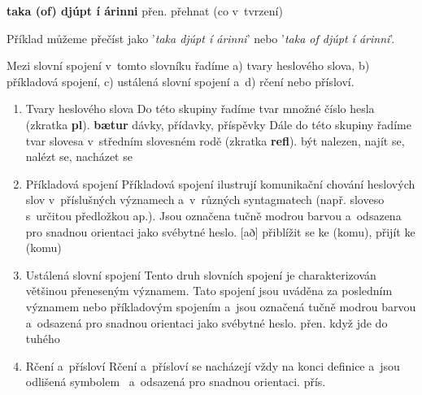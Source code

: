 \blspace
  \dicEntry {}   \textbf{taka (of) djúpt í árinni} {\footnotesize{přen.}} {přehnat (co v~tvrzení)}
\blspace

Příklad můžeme přečíst jako '\textit{taka djúpt í árinni}' nebo '\textit{taka of djúpt í árinni}'.

Mezi slovní spojení v~tomto slovníku řadíme a) tvary heslového slova, b) příkladová spojení, c) ustálená slovní spojení a~d) rčení nebo přísloví.

\begin{enumerate}
\item Tvary heslového slova
Do této skupiny řadíme tvar množné číslo hesla (zkratka \textbf{pl}).
\blspace
\dicEntry {}   \textbf{bætur}  {dávky, přídavky, příspěvky}
Dále do této skupiny řadíme tvar slovesa v~středním slovesném rodě (zkratka \textbf{refl}).
\dicEntry {}    {}  {být nalezen, najít se, nalézt se, nacházet se}
\blspace
\item Příkladová spojení
Příkladová spojení ilustrují komunikační chování heslových slov v~příslušných významech a~v~různých syntagmatech (např. sloveso s~určitou předložkou ap.). Jsou označena tučně modrou barvou a~odsazena pro snadnou orientaci jako svébytné heslo.
\blspace
\dicEntry {}   [að] {} {přiblížit se ke (komu), přijít ke (komu)}
\blspace
\item Ustálená slovní spojení
Tento druh slovních spojení je charakterizován většinou přeneseným významem. Tato spojení jsou uváděna za posledním významem nebo příkladovým spojením a~jsou označená tučně modrou barvou a~odsazená pro snadnou orientaci jako svébytné heslo.
\blspace
\dicEntry {}    {} {\footnotesize{přen.}} {když jde do tuhého}
\blspace
\item Rčení a~přísloví
Rčení a~přísloví se nacházejí vždy na konci definice a~jsou odlišená symbolem \dicsymProverb\ a~odsazená pro snadnou orientaci.
\blspace
\dicEntry {}   \dicProverb{}  {\footnotesize{přís.}} 
\end{enumerate}

